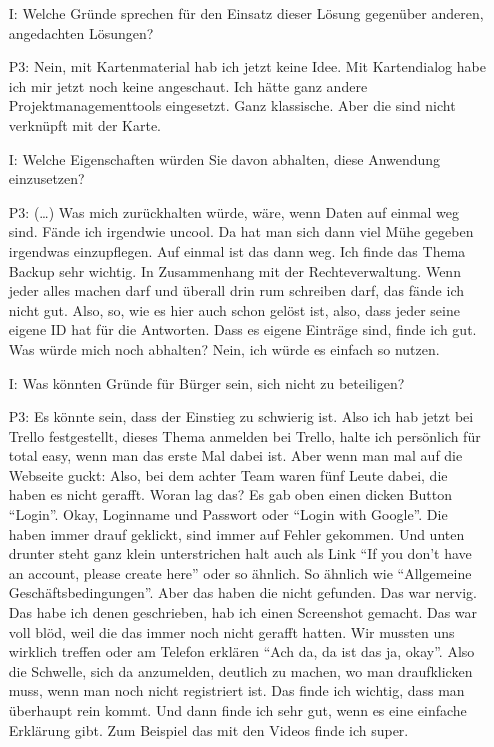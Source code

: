 \begin{itemize}
    \item[I:] Welche Gr{\"u}nde sprechen f{\"u}r den Einsatz dieser L{\"o}sung gegen{\"u}ber anderen, angedachten L{\"o}sungen?
    \item[P3:] Nein, mit Kartenmaterial hab ich jetzt keine Idee. Mit Kartendialog habe ich mir jetzt noch keine angeschaut. Ich h{\"a}tte ganz andere Projektmanagementtools eingesetzt. Ganz klassische. Aber die sind nicht verkn{\"u}pft mit der Karte.
    \item[I:] Welche Eigenschaften w{\"u}rden Sie davon abhalten, diese Anwendung einzusetzen?
    \item[P3:] (\dots) Was mich zur{\"u}ckhalten w{\"u}rde, w{\"a}re, wenn Daten auf einmal weg sind. F{\"a}nde ich irgendwie uncool. Da hat man sich dann viel M{\"u}he gegeben irgendwas einzupflegen. Auf einmal ist das dann weg. Ich finde das Thema Backup sehr wichtig. In Zusammenhang mit der Rechteverwaltung. Wenn jeder alles machen darf und {\"u}berall drin rum schreiben darf, das f{\"a}nde ich nicht gut. Also, so, wie es hier auch schon gel{\"o}st ist, also, dass jeder seine eigene ID hat f{\"u}r die Antworten. Dass es eigene Eintr{\"a}ge sind, finde ich gut. Was w{\"u}rde mich noch abhalten? Nein, ich w{\"u}rde es einfach so nutzen.
    \item[I:] Was k{\"o}nnten Gr{\"u}nde f{\"u}r B{\"u}rger sein, sich nicht zu beteiligen?
    \item[P3:] Es k{\"o}nnte sein, dass der Einstieg zu schwierig ist. Also ich hab jetzt bei Trello festgestellt, dieses Thema anmelden bei Trello, halte ich pers{\"o}nlich f{\"u}r total easy, wenn man das erste Mal dabei ist. Aber wenn man mal auf die Webseite guckt: Also, bei dem achter Team waren f{\"u}nf Leute dabei, die haben es nicht gerafft. Woran lag das? Es gab oben einen dicken Button "`Login"'. Okay, Loginname und Passwort oder "`Login with Google"'. Die haben immer drauf geklickt, sind immer auf Fehler gekommen. Und unten drunter steht ganz klein unterstrichen halt auch als Link "`If you don't have an account, please create here"' oder so {\"a}hnlich. So {\"a}hnlich wie "`Allgemeine Gesch{\"a}ftsbedingungen"'. Aber das haben die nicht gefunden. Das war nervig. Das habe ich denen geschrieben, hab ich einen Screenshot gemacht. Das war voll bl{\"o}d, weil die das immer noch nicht gerafft hatten. Wir mussten uns wirklich treffen oder am Telefon erkl{\"a}ren "`Ach da, da ist das ja, okay"'. Also die Schwelle, sich da anzumelden, deutlich zu machen, wo man draufklicken muss, wenn man noch nicht registriert ist. Das finde ich wichtig, dass man {\"u}berhaupt rein kommt. Und dann finde ich sehr gut, wenn es eine einfache Erkl{\"a}rung gibt. Zum Beispiel das mit den Videos finde ich super.
\end{itemize}

